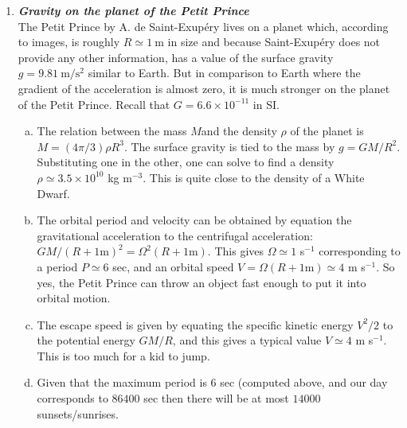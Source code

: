 \documentclass[a4paper,12pt]{article}
\newcommand{\question}[1]{\textbf{\textit{#1}}}
\begin{document}
\begin{enumerate}

\item \question{Gravity on the planet of the Petit Prince}\\
The Petit Prince by A. de Saint-Exup{\'e}ry lives on a planet which,
according to images, is roughly $R\simeq 1~\mathrm{m}$ in size and
because Saint-Exup{\'e}ry does not provide any other information, has a
value of the surface gravity $g=9.81~\mathrm{m}/\mathrm{s}^2$ similar
to Earth. But in comparison to Earth where the gradient of the
acceleration is almost zero, it is much stronger on the planet of the
Petit Prince. Recall that $G=6.6\times 10^{-11}$ in SI.
\begin{enumerate}[(a)]
\item{The relation between the mass $M$and the density $\rho$ of the planet is
    $M=(4\pi /3)\rho R^3$. The surface gravity is tied to the mass by
    $g=GM/R^2$. Substituting one in the other, one can solve to find a
    density $\rho \simeq 3.5\times 10^{10}$ kg m$^{-3}$. This is quite
  close to the density of a White Dwarf.}
\item{The orbital period and velocity can be obtained by equation the
    gravitational acceleration to the centrifugal acceleration:
    $GM/(R+1\mathrm{m})^2 = \Omega^2 (R+1\mathrm{m}) $. This gives
    $\Omega \simeq 1$ s$^{-1}$ corresponding to a period $P\simeq 6$ sec, and
    an orbital speed $V=\Omega (R+1\mathrm{m})\simeq 4$ m
    s$^{-1}$. So yes, the Petit Prince can throw an object fast enough to
    put it into orbital motion.}
\item{The escape speed is given by equating the specific kinetic
    energy $V^2/2$ to the potential energy $GM/R$, and this gives a
    typical value $V\simeq 4$ m
    s$^{-1}$. This is too much for a kid to jump.}
\item{Given that the maximum period is 6 sec (computed above, and our
    day corresponds to $86400$ sec then
    there will be at most $14000$ sunsets/sunrises.}
\end{enumerate}


\end{enumerate}
\end{document}
